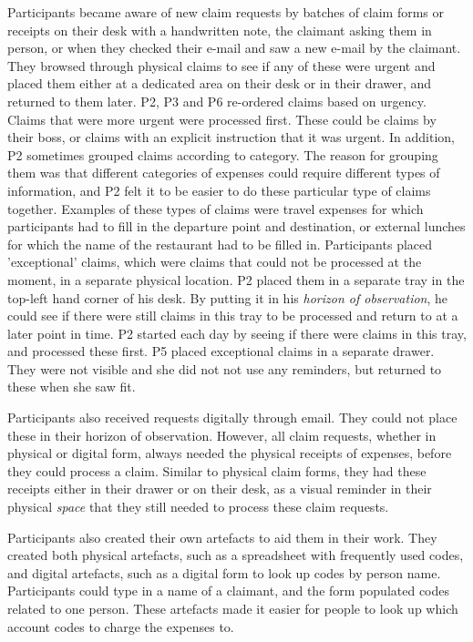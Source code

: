 Participants became aware of new claim requests by batches of claim forms or receipts on their desk with a handwritten note, the claimant asking them in person, or when they checked their e-mail and saw a new e-mail by the claimant. They browsed through physical claims to see if any of these were urgent and placed them either at a dedicated area on their desk or in their drawer, and returned to them later. P2, P3 and P6 re-ordered claims based on urgency. Claims that were more urgent were processed first. These could be claims by their boss, or claims with an explicit instruction that it was urgent. In addition, P2 sometimes grouped claims according to category. The reason for grouping them was that different categories of expenses could require different types of information, and P2 felt it to be easier to do these particular type of claims together. Examples of these types of claims were travel expenses for which participants had to fill in the departure point and destination, or external lunches for which the name of the restaurant had to be filled in. Participants placed 'exceptional' claims, which were claims that could not be processed at the moment, in a separate physical location. P2 placed them in a separate tray in the top-left hand corner of his desk. By putting it in his \textit{horizon of observation}, he could see if there were still claims in this tray to be processed and return to at a later point in time. P2 started each day by seeing if there were claims in this tray, and processed these first. P5 placed exceptional claims in a separate drawer. They were not visible and she did not not use any reminders, but returned to these when she saw fit.

Participants also received requests digitally through email. They could not place these in their horizon of observation. However, all claim requests, whether in physical or digital form, always needed the physical receipts of expenses, before they could process a claim. Similar to physical claim forms, they had these receipts either in their drawer or on their desk, as a visual reminder in their physical \textit{space} that they still needed to process these claim requests.

Participants also created their own artefacts to aid them in their work. They created both physical artefacts, such as a spreadsheet with frequently used codes, and digital artefacts, such as a digital form to look up codes by person name. Participants could type in a name of a claimant, and the form populated codes related to one person. These artefacts made it easier for people to look up which account codes to charge the expenses to. 

